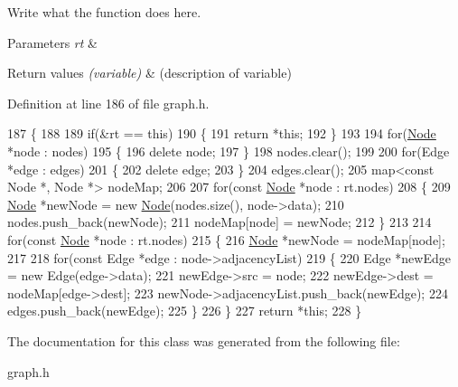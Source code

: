 Write what the function does here. 


\begin{DoxyParams}{Parameters}
{\em rt} & \\
\hline
\end{DoxyParams}

\begin{DoxyRetVals}{Return values}
{\em (variable)} & (description of variable) \\
\hline
\end{DoxyRetVals}


Definition at line 186 of file graph.\+h.


\begin{DoxyCode}
187         \{
188 
189             \textcolor{keywordflow}{if}(&rt == \textcolor{keyword}{this})
190             \{
191                 \textcolor{keywordflow}{return} *\textcolor{keyword}{this};
192             \}
193 
194             \textcolor{keywordflow}{for}(\hyperlink{classNode}{Node} *node : nodes)
195             \{
196                 \textcolor{keyword}{delete} node;
197             \}
198             nodes.clear();
199 
200             \textcolor{keywordflow}{for}(Edge *edge : edges)
201             \{
202                 \textcolor{keyword}{delete} edge;
203             \}
204             edges.clear();
205             map<const Node *, Node *> nodeMap;
206 
207             \textcolor{keywordflow}{for}(\textcolor{keyword}{const} \hyperlink{classNode}{Node} *node : rt.nodes)
208             \{
209                 \hyperlink{classNode}{Node} *newNode = \textcolor{keyword}{new} \hyperlink{classNode}{Node}(nodes.size(), node->data);
210                 nodes.push\_back(newNode);
211                 nodeMap[node] = newNode;
212             \}
213 
214             \textcolor{keywordflow}{for}(\textcolor{keyword}{const} \hyperlink{classNode}{Node} *node : rt.nodes)
215             \{
216                 \hyperlink{classNode}{Node} *newNode = nodeMap[node];
217 
218                 \textcolor{keywordflow}{for}(\textcolor{keyword}{const} Edge *edge : node->adjacencyList)
219                 \{
220                     Edge *newEdge = \textcolor{keyword}{new} Edge(edge->data);
221                     newEdge->src = node;
222                     newEdge->dest = nodeMap[edge->dest];
223                     newNode->adjacencyList.push\_back(newEdge);
224                     edges.push\_back(newEdge);
225                 \}
226             \}
227             \textcolor{keywordflow}{return} *\textcolor{keyword}{this};
228         \}
\end{DoxyCode}


The documentation for this class was generated from the following file\+:\begin{DoxyCompactItemize}
\item 
graph.\+h\end{DoxyCompactItemize}

